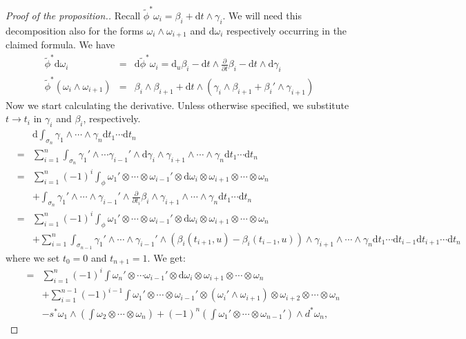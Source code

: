 \begin{proof}[Proof of the proposition.]
Recall $\widetilde{\phi}^* \omega_i = \beta_i + \mathrm{d}t \wedge \gamma_i$. 
We will need this decomposition also for the forms $\omega_i \wedge \omega_{i+1}$ and $\mathrm{d}\omega_i$ respectively occurring in the claimed formula. We have
\begin{eqnarray}\label{hoermann_eqn1}
 \widetilde{\phi}^* \mathrm{d} \omega_i &=&  \mathrm{d}\widetilde{\phi}^* \omega_i = \mathrm{d}_u \beta_i - \mathrm{d}t \wedge \frac{\partial}{\partial t} \beta_i - \mathrm{d}t \wedge \mathrm{d} \gamma_i \\
\label{hoermann_eqn2}
 \widetilde{\phi}^* (\omega_i \wedge \omega_{i+1}) &=& \beta_i \wedge \beta_{i+1} + \mathrm{d}t \wedge (\gamma_i \wedge \beta_{i+1} + \beta_i' \wedge \gamma_{i+1})
\end{eqnarray}
\noindent Now we start calculating the derivative. Unless otherwise specified, we substitute $t \to t_i$ in $\gamma_i$ and $\beta_i$, respectively.
\begin{eqnarray*}
&&\mathrm{d} \int_{\sigma_n} \gamma_1 \wedge \cdots \wedge \gamma_n \mathrm{d}t_1 \cdots \mathrm{d}t_n  \\
& = & \sum_{i=1}^n \int_{\sigma_n} \gamma_1' \wedge \cdots \gamma_{i-1}' \wedge \mathrm{d}\gamma_i \wedge \gamma_{i+1} \wedge \cdots \wedge \gamma_n \mathrm{d}t_1 \cdots \mathrm{d}t_n \\
& = & \sum_{i=1}^n (-1)^i \int_\phi  \omega_1' \otimes \cdots \otimes \omega_{i-1}' \otimes \mathrm{d}\omega_i \otimes \omega_{i+1} \otimes \cdots \otimes \omega_n \\
& & + \int_{\sigma_n} \gamma_1' \wedge \cdots \wedge \gamma_{i-1}' \wedge \frac{\partial}{\partial t_i} \beta_i \wedge \gamma_{i+1} \wedge \cdots \wedge \gamma_n \mathrm{d}t_1 \cdots \mathrm{d}t_n\\
 & = & \sum_{i=1}^n (-1)^i \int_\phi  \omega_1' \otimes \cdots \otimes \omega_{i-1}' \otimes \mathrm{d}\omega_i \otimes \omega_{i+1} \otimes \cdots \otimes \omega_n \\
& & + \sum_{i=1}^n \int_{\sigma_{n-1}} \gamma_1' \wedge \cdots \wedge \gamma_{i-1}' \wedge ( \beta_i(t_{i+1}, u) - \beta_i(t_{i-1}, u)) \wedge \gamma_{i+1} \wedge \cdots \wedge \gamma_n \mathrm{d}t_1\cdots \mathrm{d}t_{i-1}\mathrm{d}t_{i+1}\cdots \mathrm{d}t_{n}
\end{eqnarray*}
where we set $t_0 = 0$ and $t_{n+1} = 1$. We get:
\begin{eqnarray*}
&=& \sum_{i = 1}^n (-1)^i \int \omega_n' \otimes  \cdots \omega_{i-1}'  \otimes \mathrm{d}\omega_i  \otimes \omega_{i+1}  \otimes \cdots  \otimes \omega_n \\
&&+ \sum_{i=1}^{n-1} (-1)^{i-1} \int \omega_1'  \otimes \cdots  \otimes \omega_{i-1}'  \otimes (\omega_i' \wedge \omega_{i+1})  \otimes \omega_{i+2}  \otimes \cdots  \otimes \omega_n \\
&&- s^* \omega_1 \wedge (\int \omega_2  \otimes \cdots  \otimes \omega_n) + (-1)^n (\int \omega_1'  \otimes \cdots  \otimes \omega_{n-1}') \wedge d^* \omega_n,
\end{eqnarray*}
\end{proof}



